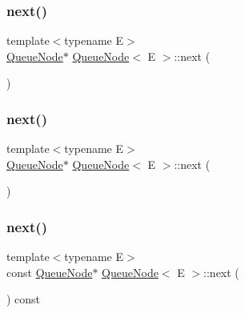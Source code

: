 \mbox{\label{class_queue_node_a8a9fdf488da06533360999ef85db56ea}} 
\subsubsection{\texorpdfstring{next()}{next()}\hspace{0.1cm}{\footnotesize\ttfamily [2/6]}}
{\footnotesize\ttfamily template$<$typename E$>$ \\
\mbox{\hyperlink{class_queue_node}{Queue\+Node}}$\ast$ \mbox{\hyperlink{class_queue_node}{Queue\+Node}}$<$ E $>$\+::next (\begin{DoxyParamCaption}{ }\end{DoxyParamCaption})\hspace{0.3cm}{\ttfamily [inline]}}

\mbox{\label{class_queue_node_a8a9fdf488da06533360999ef85db56ea}} 
\subsubsection{\texorpdfstring{next()}{next()}\hspace{0.1cm}{\footnotesize\ttfamily [3/6]}}
{\footnotesize\ttfamily template$<$typename E$>$ \\
\mbox{\hyperlink{class_queue_node}{Queue\+Node}}$\ast$ \mbox{\hyperlink{class_queue_node}{Queue\+Node}}$<$ E $>$\+::next (\begin{DoxyParamCaption}{ }\end{DoxyParamCaption})\hspace{0.3cm}{\ttfamily [inline]}}

\mbox{\label{class_queue_node_ada477e4f309f29383112dbda473dd985}} 
\subsubsection{\texorpdfstring{next()}{next()}\hspace{0.1cm}{\footnotesize\ttfamily [4/6]}}
{\footnotesize\ttfamily template$<$typename E$>$ \\
const \mbox{\hyperlink{class_queue_node}{Queue\+Node}}$\ast$ \mbox{\hyperlink{class_queue_node}{Queue\+Node}}$<$ E $>$\+::next (\begin{DoxyParamCaption}{ }\end{DoxyParamCaption}) const\hspace{0.3cm}{\ttfamily [inline]}}


